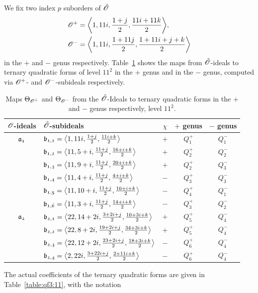 We fix two index $p$ suborders of ${\tilde{{\mathscr{O}}}}$
\begin{align*}
  \Ops & = \<1,11i,\frac{1+j}{2},\frac{11i+11k}{2}>, \\
  \Ons & = \<1,11i,\frac{1+11j}{2},\frac{1+11i+j+k}{2}>
\end{align*}
in the $+$ and $-$ genus respectively.
Table~\ref{table:psi:11} shows the maps from ${\tilde{{\mathscr{O}}}}$-ideals
to ternary quadratic forms of level $11^2$ in the $+$ genus
and in the $-$ genus, computed via ${{\mathscr{O}}^+}$- and ${{\mathscr{O}}^-}$-subideals respectively.
\begin{table}
\begin{tabular}{|c|l|c|c|c|}
\hline
${\mathscr{O}}$-ideals & ${\tilde{{\mathscr{O}}}}$-subideals & $\chi$ & $+$ genus & $-$ genus \\
\hline\hline
${\mathfrak{a_{1}}}$ & $\id{b_{1,1}}=\<1,11i,\frac{1+j}{2},\frac{11i+k}{2}>$ & $+$ & $Q_{1}^{+}$ & $Q_{1}^{-}$\\
 & $\id{b_{1,2}}=\<11,5+i,\frac{11+j}{2},\frac{16+i+k}{2}>$ & $+$ & $Q_{2}^{+}$ & $Q_{2}^{-}$\\
 & $\id{b_{1,3}}=\<11,9+i,\frac{11+j}{2},\frac{20+i+k}{2}>$ & $+$ & $Q_{2}^{+}$ & $Q_{3}^{-}$\\
 & $\id{b_{1,4}}=\<11,4+i,\frac{11+j}{2},\frac{4+i+k}{2}>$ & $-$ & $Q_{3}^{+}$ & $Q_{3}^{-}$\\
 & $\id{b_{1,5}}=\<11,10+i,\frac{11+j}{2},\frac{10+i+k}{2}>$ & $-$ & $Q_{4}^{+}$ & $Q_{1}^{-}$\\
 & $\id{b_{1,6}}=\<11,3+i,\frac{11+j}{2},\frac{14+i+k}{2}>$ & $-$ & $Q_{3}^{+}$ & $Q_{2}^{-}$\\
\hline
${\mathfrak{a_{2}}}$ & $\id{b_{2,1}}=\<22,14+2i,\frac{3+2i+j}{2},\frac{10+3i+k}{2}>$ & $+$ & $Q_{5}^{+}$ & $Q_{4}^{-}$\\
 & $\id{b_{2,2}}=\<22,8+2i,\frac{19+2i+j}{2},\frac{34+3i+k}{2}>$ & $+$ & $Q_{5}^{+}$ & $Q_{4}^{-}$\\
 & $\id{b_{2,3}}=\<22,12+2i,\frac{23+2i+j}{2},\frac{18+3i+k}{2}>$ & $-$ & $Q_{6}^{+}$ & $Q_{4}^{-}$\\
 & $\id{b_{2,4}}=\<2,22i,\frac{3+22i+j}{2},\frac{2+11i+k}{2}>$ & $-$ & $Q_{6}^{+}$ & $Q_{4}^{-}$\\
\hline
\end{tabular}
\caption{Maps ${\Theta}_{{{\mathscr{O}}^+}}$ and ${\Theta}_{{{\mathscr{O}}^-}}$ from the ${\tilde{{\mathscr{O}}}}$-Ideals
to ternary quadratic forms in the $+$ and $-$ genus respectively, level $11^2$.
          \label{table:psi:11}}
\end{table}
The actual coefficients of the ternary quadratic forms are given in
Table~\ref{table:qf3:11}, with the notation
